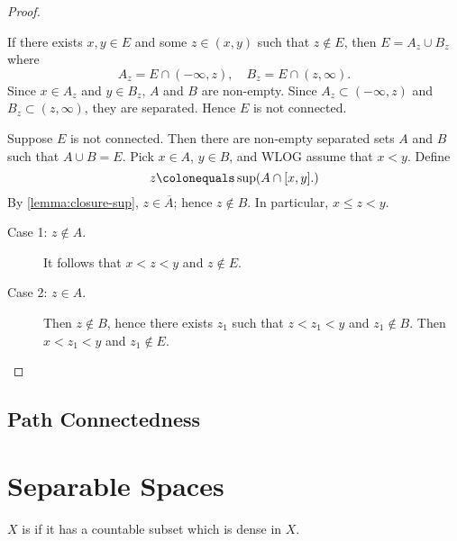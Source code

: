 \begin{proof} \

\backward If there exists $x,y\in E$ and some $z\in(x,y)$ such that $z\notin E$, then $E=A_z\cup B_z$ where
\[ A_z=E\cap(-\infty,z), \quad B_z=E\cap(z,\infty). \]
Since $x\in A_z$ and $y\in B_z$, $A$ and $B$ are non-empty. Since $A_z\subset(-\infty,z)$ and $B_z\subset(z,\infty)$, they are separated. Hence $E$ is not connected.

\forward Suppose $E$ is not connected. Then there are non-empty separated sets $A$ and $B$ such that $A\cup B=E$. Pick $x\in A$, $y\in B$, and WLOG assume that $x<y$. Define
\[z\colonequals\sup(A\cap[x,y].)\]
By \ref{lemma:closure-sup}, $z\in\overline{A}$; hence $z\notin B$. In particular, $x\le z<y$.
\begin{description}
\item[Case 1: $z\notin A$.] It follows that $x<z<y$ and $z\notin E$.
\item[Case 2: $z\in A$.] Then $z\notin B$, hence there exists $z_1$ such that $z<z_1<y$ and $z_1\notin B$. Then $x<z_1<y$ and $z_1\notin E$.
\end{description}
\end{proof}
\pagebreak

\subsection{Path Connectedness}

\pagebreak

\section{Separable Spaces}
\begin{definition}
$X$ is  if it has a countable subset which is dense in $X$.
\end{definition}

